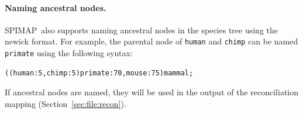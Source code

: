 \documentclass[11pt]{article}
\newcommand{\secref}[1]{Section~\ref{#1}}
\newcommand{\spimap}{{\sf\scshape SPIMAP}}
\begin{document}
\paragraph{Naming ancestral nodes.}
\spimap\ also supports naming ancestral nodes in the species tree using
the newick format.  For example, the parental node of {\tt human} and 
{\tt chimp} can be named {\tt primate} using the following syntax:

\begin{lstlisting}
((human:5,chimp:5)primate:70,mouse:75)mammal;
\end{lstlisting}

If ancestral nodes are named, they will be used in the output of the 
reconciliation mapping (\secref{sec:file:recon}).



\end{document}
